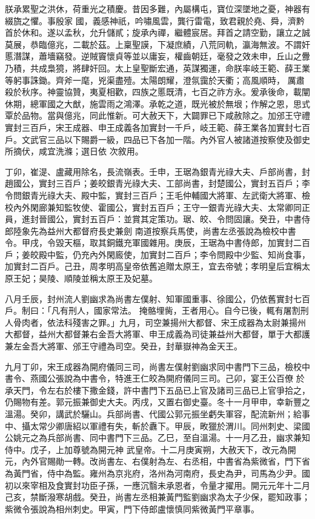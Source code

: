 \begin{pinyinscope}
 朕承累聖之洪休，荷重光之積慶。昔因多難，內屬構屯，寶位深墜地之憂，神器有綴旒之懼。事殷家
 國，義感神祇，吟嘯風雲，龔行雷電，致君親於堯、舜，濟黔首於休和。遂以孟秋，允升儲貳；旋承內禪，繼體宸居。拜首之請空勤，讓立之誠莫展，恭臨億兆，二載於茲。上稟聖謨，下凝庶績，八荒同軌，瀛海無波。不謂奸慝潛謀，蕭墻竊發。逆賊竇懷貞等並以庸妄，權齒朝廷，毫發之效未申，丘山之釁乃積，共成梟獍，將肆奸回。太上皇聖斷宏通，英謀獨運，命朕率岐王範、薛王業等躬事誅鋤。齊斧一麾，兇渠盡殪。太陽朗耀，澄氛靄於天衢；高風順時，
 厲肅殺於秋序。神靈協贊，夷夏相歡，四族之慝既清，七百之祚方永。爰承後命，載闡休期，總軍國之大猷，施雲雨之鴻澤。承乾之道，既光被於無垠；作解之恩，思式覃於品物。當與億兆，同此惟新。可大赦天下，大闢罪已下咸赦除之。加邠王守禮實封三百戶，宋王成器、申王成義各加實封一千戶，岐王範、薛王業各加實封七百戶。文武官三品以下賜爵一級，四品已下各加一階。內外官人被諸道按察使及御史所摘伏，咸宜洗滌；選日依
 次敘用。



 丁卯，崔湜、盧藏用除名，長流嶺表。壬申，王琚為銀青光祿大夫、戶部尚書，封趙國公，實封三百戶；姜皎銀青光祿大夫、工部尚書，封楚國公，實封五百戶；李令問銀青光祿大夫、殿中監，實封三百戶；王毛仲輔國大將軍、左武衛大將軍、檢校內外閑廊兼知監牧使、霍國公，實封五百戶；王守一銀青光祿大夫、太常卿同正員，進封晉國公，實封五百戶：並賞其定策功。琚、皎、令問固讓。癸丑，中書侍郎陸象先為益州大都督府長史兼劍
 南道按察兵馬使，尚書左丞張說為檢校中書令。甲戌，令毀天樞，取其銅鐵充軍國雜用。庚辰，王琚為中書侍郎，加實封二百戶；姜皎殿中監，仍充內外閑廄使，加實封二百戶；李令問殿中少監、知尚食事，加實封二百戶。己丑，周孝明高皇帝依舊追贈太原王，宜去帝號；孝明皇后宜稱太原王妃；昊陵、順陵並稱太原王及妃墓。



 八月壬辰，封州流人劉幽求為尚書左僕射、知軍國重事、徐國公，仍依舊實封七百戶。制曰：「凡有刑人，國家常法。
 掩骼埋胔，王者用心。自今已後，輒有屠割刑人骨肉者，依法科殘害之罪。」九月，司空兼揚州大都督、宋王成器為太尉兼揚州大都督，益州大都督兼右金吾大將軍、申王成義為司徒兼益州大都督，單于大都護兼左金吾大將軍、邠王守禮為司空。癸丑，封華嶽神為金天王。



 九月丁卯，宋王成器為開府儀同三司，尚書左僕射劉幽求同中書門下三品，檢校中書令、燕國公張說為中書令，特進王仁皎為開府儀同三司。己卯，宴王公百僚
 於承天門，令左右於樓下撒金錢，許中書門下五品已上官及諸司三品已上官爭拾之，仍賜物有差。郭元振兼御史大夫。丙戌，又置右御史臺。冬十一月甲申，幸新豐之溫湯。癸卯，講武於驪山。兵部尚書、代國公郭元振坐虧失軍容，配流新州；給事中、攝太常少卿唐紹以軍禮有失，斬於纛下。甲辰，畋獵於渭川。同州刺史、梁國公姚元之為兵部尚書、同中書門下三品。乙巳，至自溫湯。十一月乙丑，幽求兼知侍中。戊子，上加尊號為開元神
 武皇帝。十二月庚寅朔，大赦天下，改元為開元，內外官賜勛一轉。改尚書左、右僕射為左、右丞相，中書省為紫微省，門下省為黃門省，侍中為監。雍州為京兆府，洛州為河南府，長史為尹，司馬為少尹。國初以來宰相及食實封功臣子孫，一應沉翳未承恩者，令量才擢用。開元元年十二月己亥，禁斷潑寒胡戲。癸丑，尚書左丞相兼黃門監劉幽求為太子少保，罷知政事；紫微令張說為相州刺史。甲寅，門下侍郎盧懷慎同紫微黃門平章事。




\end{pinyinscope}
